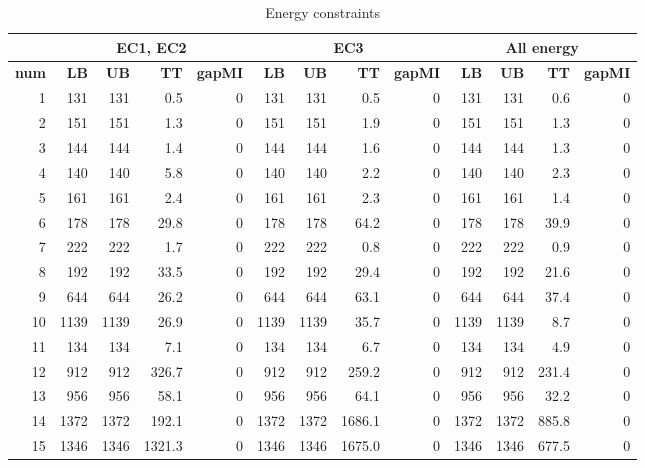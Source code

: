 \documentclass[11pt]{article}
\theoremstyle{plain}%
\theoremstyle{definition} \newtheorem{lem}{Lemma}[section]
\theoremstyle{definition} \newtheorem{claim}{Claim}[lem]
\theoremstyle{definition} \newtheorem{theorem}{Theorem}[section]
\theoremstyle{definition} \newtheorem{exo}{Exercice n$^\circ$}
\theoremstyle{definition} \newtheorem{quest}{}[exo]
\theoremstyle{definition} \newtheorem{sousquest}{}[quest]
\theoremstyle{remark}
\theoremstyle{definition}
\begin{document}
\begin{table}[H]
  \centering
  \small
  \caption{Energy constraints}
    \begin{tabular}{|r|rrrr|rrrr|rrrr|}
    \toprule
    &\multicolumn{4}{c|}{\textbf{ EC1, EC2}}     & \multicolumn{4}{c|}{\textbf{ EC3}} & \multicolumn{4}{c|}{\textbf{ All energy}} \\
    \midrule
    \textbf{num} & \textbf{LB} & \textbf{UB}  & \textbf{TT} & \textbf{gapMI} &  \textbf{LB} & \textbf{UB}  &\textbf{TT} & \textbf{gapMI} &  \textbf{LB} & \textbf{UB}  &\textbf{TT} & \textbf{gapMI} \\
    \midrule
    1     & 131   & 131& 0.5   & 0  & 131   & 131&    0.5   & 0  & 131   & 131& 0.6   & 0\\
    2     & 151   & 151 & 1.3   & 0  & 151   & 151 & 1.9  & 0 & 151   & 151& 1.3   & 0 \\
    3     & 144   & 144 & 1.4   & 0 & 144   & 144     & 1.6   & 0 & 144   & 144& 1.3   & 0 \\
    4     & 140   & 140  & 5.8   & 0  & 140   & 140  & 2.2   & 0& 140   & 140& 2.3   & 0 \\
    5     & 161   & 161& 2.4   & 0     & 161   & 161 & 2.3   & 0 & 161   & 161 & 1.4   & 0\\
    6     & 178   & 178& 29.8  & 0   & 178   & 178  & 64.2  & 0 & 178   & 178 & 39.9  & 0 \\
    7     & 222   & 222&  1.7   & 0  & 222   & 222   & 0.8   & 0& 222   & 222& 0.9   & 0 \\
    8     & 192   & 192&  33.5  & 0  & 192   & 192   &29.4  & 0& 192   & 192 & 21.6  & 0 \\
    9     & 644   & 644 & 26.2  & 0   & 644   & 644   &  63.1  & 0 & 644   & 644  & 37.4  & 0\\
    10    & 1139  & 1139 &26.9  & 0   & 1139  & 1139  &35.7  & 0& 1139  & 1139  & 8.7   & 0 \\
    11    & 134   & 134& 7.1   & 0 & 134   & 134    &  6.7   & 0 & 134   & 134 & 4.9   & 0\\
    12    & 912   & 912&  326.7 & 0& 912   & 912     &  259.2 & 0 & 912   & 912& 231.4 & 0 \\
    13    & 956   & 956&  58.1  & 0   & 956   & 956  &  64.1  & 0& 956   & 956& 32.2  & 0 \\
    14    & 1372  & 1372&  192.1 & 0 & 1372  & 1372    &  1686.1 & 0& 1372  & 1372 & 885.8 & 0 \\
    15    & 1346  & 1346& 1321.3 & 0  & 1346  & 1346  & 1675.0 & 0 & 1346  & 1346& 677.5 & 0 \\

\end{tabular}
\end{table}
\end{document}
